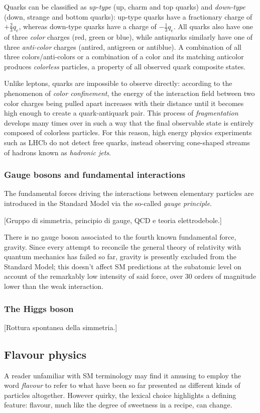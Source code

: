 Quarks can be classified as \textit{up-type} (up, charm and top quarks) and \textit{down-type} (down, strange and bottom quarks): up-type quarks have a fractionary charge of $+\frac{2}{3} q_e$, whereas down-type quarks have a charge of $-\frac{1}{3} q_e$. All quarks also have one of three \textit{color} charges (red, green or blue), while antiquarks similarly have one of three \textit{anti-color} charges (antired, antigreen or antiblue). A combination of all three colors/anti-colors or a combination of a color and its matching anticolor produces \textit{colorless} particles, a property of all observed quark composite states.

Unlike leptons, quarks are impossible to observe directly: according to the phenomenon of \textit{color confinement}, the energy of the interaction field between two color charges being pulled apart increases with their distance until it becomes high enough to create a quark-antiquark pair.
This process of \textit{fragmentation} develops many times over in such a way that the final observable state is entirely composed of colorless particles.
For this reason, high energy physics experiments such as LHCb do not detect free quarks, instead observing cone-shaped streams of hadrons known as \textit{hadronic jets}.

\subsubsection{Gauge bosons and fundamental interactions}
The fundamental forces driving the interactions between elementary particles are introduced in the Standard Model via the so-called \textit{gauge principle}.

[Gruppo di simmetria, principio di gauge, QCD e teoria elettrodebole.]

There is no gauge boson associated to the fourth known fundamental force, gravity.
Since every attempt to reconcile the general theory of relativity with quantum mechanics has failed so far, gravity is presently excluded from the Standard Model; this doesn't affect SM predictions at the subatomic level on account of the remarkably low intensity of said force, over 30 orders of magnitude lower than the weak interaction.

\subsubsection{The Higgs boson}
[Rottura spontanea della simmetria.]

\subsection{Flavour physics} \label{sec:flavour-physics}
A reader unfamiliar with SM terminology may find it amusing to employ the word \textit{flavour} to refer to what have been so far presented as different kinds of particles altogether.
However quirky, the lexical choice highlights a defining feature: flavour, much like the degree of sweetness in a recipe, can change.


